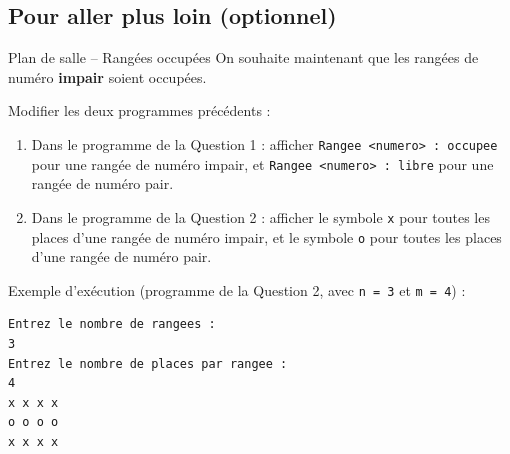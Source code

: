 \subsection{Pour aller plus loin (optionnel)}

\begin{UPSTIManipulation}{Plan de salle -- Rangées occupées}
	On souhaite maintenant que les rangées de numéro \textbf{impair} soient occupées.

	Modifier les deux programmes précédents :
	\begin{enumerate}
		\item Dans le programme de la Question 1 : afficher \texttt{Rangee <numero> : occupee} pour une rangée de numéro impair, et \texttt{Rangee <numero> : libre} pour une rangée de numéro pair.
		\item Dans le programme de la Question 2 : afficher le symbole \texttt{x} pour toutes les places d'une rangée de numéro impair, et le symbole \texttt{o} pour toutes les places d'une rangée de numéro pair.
	\end{enumerate}

	Exemple d'exécution (programme de la Question 2, avec \texttt{n = 3} et \texttt{m = 4}) :
	\begin{lstlisting}[language=bash,style=console]
Entrez le nombre de rangees :
3
Entrez le nombre de places par rangee :
4
x x x x
o o o o
x x x x
\end{lstlisting}
\end{UPSTIManipulation}
